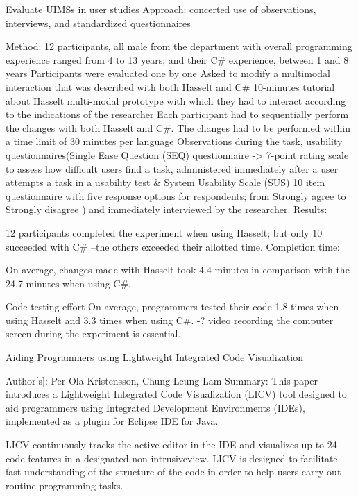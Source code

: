 			
		


Evaluate UIMSs in user studies
Approach: concerted use of observations, interviews, and standardized questionnaires

Method:
12 participants, all male from the department with overall programming experience ranged from 4 to 13 years; and their C\# experience, between 1 and 8 years
Participants were evaluated one by one
Asked to modify a multimodal interaction that was described with both Hasselt and C\#
10-minutes tutorial about Hasselt
multi-modal prototype with which they had to interact according to the indications of the researcher
Each participant had to sequentially perform the changes with both Hasselt and C\#.
The changes had to be performed within a time limit of 30 minutes per language
Observations during the task, usability questionnaires(Single Ease Question (SEQ) questionnaire -> 7-point rating scale to assess how difficult users find a task, administered immediately after a user attempts a task in a usability test \& System Usability Scale (SUS) 10 item questionnaire with five response options for respondents; from Strongly agree to Strongly disagree ) and immediately interviewed by the researcher.
Results:
					
12 participants completed the experiment when using Hasselt; but only 10 succeeded with C\# –the others exceeded their allotted time.  			
Completion time:		 	 	 		
			
On average, changes made with Hasselt took 4.4 minutes in comparison with the 24.7 minutes when using C\#. 			
					
Code testing effort 
On average, programmers tested their code 1.8 times when using Hasselt and 3.3 times when using C\#. 
					 							-? video recording the computer screen during the experiment is essential. 
	



		
Aiding Programmers using Lightweight Integrated Code Visualization

Author[s]:  Per Ola Kristensson, Chung Leung Lam
Summary: This paper introduces a Lightweight Integrated Code Visualization (LICV) tool designed to aid programmers using Integrated Development Environments (IDEs), implemented as a plugin for Eclipse IDE for Java. 

LICV continuously tracks the active editor in the IDE and visualizes up to 24 code features in a designated non-intrusiveview.  LICV is designed to facilitate fast understanding of the structure of the code in order to help users carry out routine programming tasks.

